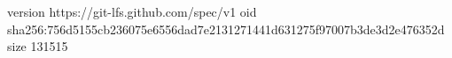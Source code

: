 version https://git-lfs.github.com/spec/v1
oid sha256:756d5155cb236075e6556dad7e2131271441d631275f97007b3de3d2e476352d
size 131515

